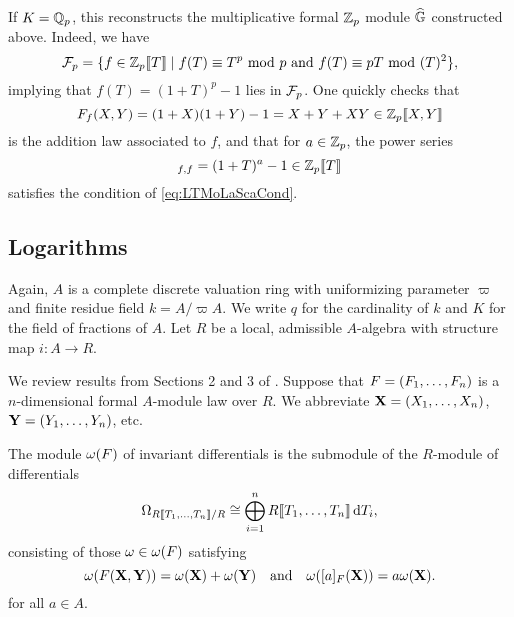 \documentclass[../main.tex]{subfiles}
\begin{document}
\begin{xpl}
  If $K = \mathbb{Q}_p$, this reconstructs the multiplicative formal 
  $\mathbb{Z}_p$ module $\widehat{\mathbb{G}}$ constructed above. Indeed, we have 
  \begin{equation*}
    \mathcal{F}_p = \{f \in \mathbb{Z}_p\llbracket T \rrbracket \mid f(T) \equiv T^p \text{ mod } p
    \text{ and } f(T) \equiv pT \text{ mod } (T)^2 \},
  \end{equation*}
  implying that $f(T) = (1+T)^p-1$ lies in $\mathcal{F}_p$.  
  One quickly checks that 
  \begin{equation*}
    F_f(X,Y) = (1+X)(1+Y) - 1 = X + Y + XY \in \mathbb{Z}_p \llbracket X,Y \rrbracket
  \end{equation*}
  is the addition law associated to $f$, and that 
  for $a \in \mathbb{Z}_p$, the power series
  \begin{equation*}
    [a]_{f,f} = (1+T)^{a} - 1 \in \Z_p \llbr T \rrbr
  \end{equation*}
  satisfies the condition of \eqref{eq:LTMoLaScaCond}. 
\end{xpl}


\subsection{Logarithms} %
\label{sub:Logarithms}
Again, $A$ is a complete discrete valuation ring with uniformizing parameter 
$\varpi$ and finite residue field $k = A/\varpi A$. We write $q$ for the cardinality of 
$k$ and $K$ for the field of fractions of $A$. Let $R$ be a local,
admissible $A$-algebra with structure map $i: A \to R$.

We review results from Sections
2 and 3 of \cite{hopkins1994equivariant}. 
Suppose that ${F} = (F_1, \dots, F_n)$ is a $n$-dimensional formal $A$-module
law over $R$. We abbreviate $\mathbf{X} = (X_1, \dots, X_n)$, $\mathbf{Y} = (Y_1,
\dots, Y_n)$, etc.

\begin{defi}
  The module $\omega({F})$ of invariant differentials is the submodule of the
  $R$-module of differentials
  \begin{equation*}
    \Omega_{R\llbracket T_1, \dots, T_n \rrbracket/R} \cong \bigoplus_{i=1}^n R\llbracket T_1, \dots, T_n
    \rrbracket \, \mathrm{d} T_i,
  \end{equation*}
  consisting of those $\omega \in \omega({F})$ satisfying
  \begin{equation}\label{eq:diffcond}
    \omega({F}(\mathbf{X},\mathbf{Y})) = \omega(\mathbf{X}) + \omega(\mathbf{Y})\quad \text{and} \quad
    \omega([a]_{F}(\mathbf{X})) = a\omega(\mathbf{X}).
  \end{equation} 
  for all $a \in A$. 
\end{defi}
\end{document}
